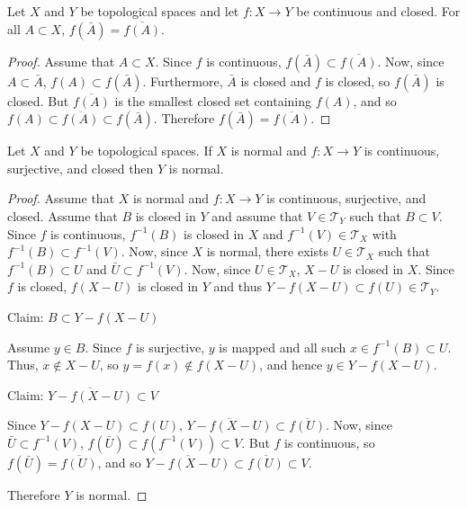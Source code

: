 \documentclass[letterpaper,12pt,fleqn]{article}
\newcommand{\T}{\mathscr{T}}
\begin{document}
\begin{lemma}
  Let \(X\) and \(Y\) be topological spaces and let \(f:X\to Y\) be continuous and closed.  For all \(A\subset X\),
  \(f(\bar{A})=\overline{f(A)}\).
\end{lemma}

\begin{proof}
  Assume that \(A\subset X\).  Since \(f\) is continuous, \(f(\bar{A})\subset\overline{f(A)}\).  Now, since
  \(A\subset\bar{A}\), \(f(A)\subset f(\bar{A})\).  Furthermore, \(\bar{A}\) is closed and \(f\) is closed, so
  \(f(\bar{A})\) is closed.  But \(\overline{f(A)}\) is the smallest closed set containing \(f(A)\), and so
  \(f(A)\subset\overline{f(A)}\subset f(\bar{A})\).  Therefore \(f(\bar{A})=\overline{f(A)}\).
\end{proof}

\begin{theorem}
  Let \(X\) and \(Y\) be topological spaces.  If \(X\) is normal and \(f:X\to Y\) is continuous, surjective, and
  closed then \(Y\) is normal.
\end{theorem}

\begin{proof}
  Assume that \(X\) is normal and \(f:X\to Y\) is continuous, surjective, and closed.  Assume that \(B\) is closed
  in \(Y\) and assume that \(V\in\T_Y\) such that \(B\subset V\).  Since \(f\) is continuous, \(f^{-1}(B)\) is
  closed in \(X\) and \(f^{-1}(V)\in\T_X\) with \(f^{-1}(B)\subset f^{-1}(V)\).  Now, since \(X\) is normal, there
  exists \(U\in\T_X\) such that \(f^{-1}(B)\subset U\) and \(\bar{U}\subset f^{-1}(V)\).  Now, since \(U\in\T_X\),
  \(X-U\) is closed in \(X\).  Since \(f\) is closed, \(f(X-U)\) is closed in \(Y\) and thus
  \(Y-f(X-U)\subset f(U)\in\T_Y\).

  Claim: \(B\subset Y-f(X-U)\)

  Assume \(y\in B\).  Since \(f\) is surjective, \(y\) is mapped and all such \(x\in f^{-1}(B)\subset U\).  Thus,
  \(x\notin X-U\), so \(y=f(x)\notin f(X-U)\), and hence \(y\in Y-f(X-U)\).

  Claim: \(\overline{Y-f(X-U)}\subset V\)

  Since \(Y-f(X-U)\subset f(U)\), \(\overline{Y-f(X-U)}\subset\overline{f(U)}\).  Now, since
  \(\bar{U}\subset f^{-1}(V)\), \(f(\bar{U})\subset f(f^{-1}(V))\subset V\).  But \(f\) is continuous, so
  \(f(\bar{U})=\overline{f(U)}\), and so \(\overline{Y-f(X-U)}\subset\overline{f(U)}\subset V\).

  Therefore \(Y\) is normal.
\end{proof}
\end{document}
